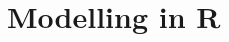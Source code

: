 \documentclass[xcolor={table},handout]{beamer}
\begin{document}



\section{Modelling in R}
\end{document}
